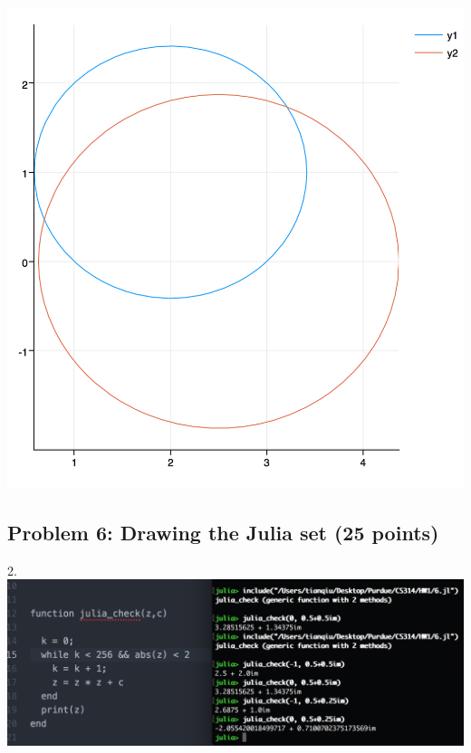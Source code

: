 \documentclass[]{article}
\begin{document}
\begin{enumerate}
\includegraphics[scale=0.8]{5_3_1}

\end{enumerate}






\subsection{Problem 6: Drawing the Julia set (25
points)}\label{problem-6-drawing-the-julia-set-25-points}

2. \includegraphics[scale=0.6]{6_1}
\end{document}
